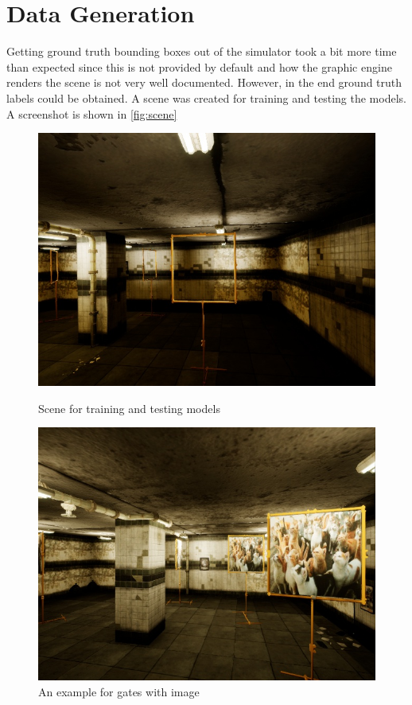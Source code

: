 \documentclass{article}
\begin{document}
\section{Data Generation}
Getting ground truth bounding boxes out of the simulator took a bit more time than expected since this is not provided by default and how the graphic engine renders the scene is not very well documented. However, in the end ground truth labels could be obtained. A scene was created for training and testing the models. A screenshot is shown in \autoref{fig:scene}
\begin{figure}
	\begin{minipage}{0.5\textwidth}
		\includegraphics[width=\textwidth]{fig/industrial}
		\caption{Scene for training and testing models}
			\label{fig:scene}
	\end{minipage}
	\begin{minipage}{0.5\textwidth}
	\includegraphics[width=\textwidth]{fig/industrial_cats}
		\caption{An example for gates with image}
		\label{fig:cats}
	\end{minipage}

\end{figure} 
\end{document}
